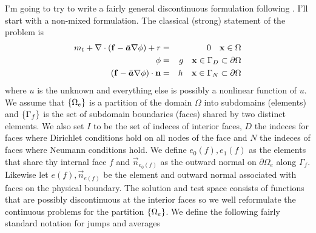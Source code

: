 \documentclass[10pt,dvips,twoside,reqno]{amsart}
\begin{document}
I'm going to try to write a fairly general discontinuous formulation
following \cite{Brezzi_etal_05}.  I'll start with a non-mixed
formulation. The classical (strong) statement of the problem is
\begin{eqnarray}
m_t + \nabla \cdot \left( {\bf f} - \bar{\mbox{{\boldmath ${a}$}}} \nabla \phi \right) + r &=& 0 \quad {\bf x} \in \Omega\\
\phi &=& g \quad {\bf x} \in \Gamma_D \subset \partial \Omega \\ 
\left( {\bf f} - \bar{\mbox{{\boldmath ${a}$}}} \nabla \phi \right) \cdot {\bf n} &=& h \quad {\bf x} \in \Gamma_N \subset \partial \Omega
\end{eqnarray}
where $u$ is the unknown and everything else is possibly a nonlinear
function of $u$.  We assume that $\left\{ \Omega_e \right\}$ is a partition
of the domain $\Omega$ into subdomains (elements) and $\left\{ \Gamma_f
\right\}$ is the set of subdomain boundaries (faces) shared by two
distinct elements. We also set $I$ to be the set of indeces of
interior faces, $D$ the indeces for faces where Dirichlet conditions
hold on all nodes of the face and $N$ the indeces of faces where
Neumann conditions hold. We define $e_0(f),e_1(f)$ as the elements that
share thy internal face $f$ and $\vec n_{e_0(f)}$ as the outward normal
on $\partial \Omega_e$ along $\Gamma_f$. Likewise let $e(f), \vec
n_{e(f)}$ be the element and outward normal associated with faces on
the physical boundary. The solution and test space consists of
functions that are possibly discontinuous at the interior faces so we well reformulate the continuous problems for the partition $\left\{ \Omega_e \right\}$. We define the following fairly standard notation for jumps and averages
\end{document}
